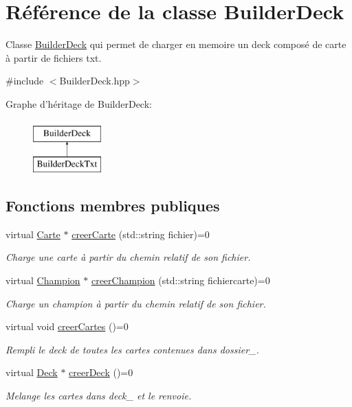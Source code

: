 \hypertarget{class_builder_deck}{\section{Référence de la classe Builder\-Deck}
\label{class_builder_deck}
}


Classe \hyperlink{class_builder_deck}{Builder\-Deck} qui permet de charger en memoire un deck composé de carte à partir de fichiers txt.  




{\ttfamily \#include $<$Builder\-Deck.\-hpp$>$}

Graphe d'héritage de Builder\-Deck\-:\begin{figure}[H]
\begin{center}
\leavevmode
\includegraphics[height=2.000000cm]{class_builder_deck}
\end{center}
\end{figure}
\subsection*{Fonctions membres publiques}
\begin{DoxyCompactItemize}
\item 
virtual \hyperlink{class_carte}{Carte} $\ast$ \hyperlink{class_builder_deck_a6318e704c6b8739fc6666dbc4ab61be2}{creer\-Carte} (std\-::string fichier)=0
\begin{DoxyCompactList}\small\item\em Charge une carte à partir du chemin relatif de son fichier. \end{DoxyCompactList}\item 
virtual \hyperlink{class_champion}{Champion} $\ast$ \hyperlink{class_builder_deck_aeb26090c61c4729af8010b5c4e282389}{creer\-Champion} (std\-::string fichiercarte)=0
\begin{DoxyCompactList}\small\item\em Charge un champion à partir du chemin relatif de son fichier. \end{DoxyCompactList}\item 
virtual void \hyperlink{class_builder_deck_a382f879b47ad1115f4357a3ff0f21e2b}{creer\-Cartes} ()=0
\begin{DoxyCompactList}\small\item\em Rempli le deck de toutes les cartes contenues dans dossier\-\_\-. \end{DoxyCompactList}\item 
virtual \hyperlink{class_deck}{Deck} $\ast$ \hyperlink{class_builder_deck_a8d4db97ac54a8d341591304e3027e7be}{creer\-Deck} ()=0
\begin{DoxyCompactList}\small\item\em Melange les cartes dans deck\-\_\- et le renvoie. \end{DoxyCompactList}\end{DoxyCompactItemize}
